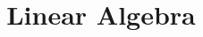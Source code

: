 \documentclass[letterpaper]{report}
\title{Linear Algebra}
\begin{document}
    \maketitle
    \tableofcontents
    \newpage
    
    \begin{multicols}{2}
    \end{multicols}
\end{document}
